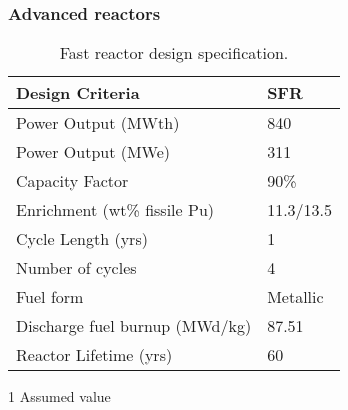 \begin{frame}
    \frametitle{Advanced reactors}
    \vspace{-0.7cm}
    \begingroup
        \renewcommand{\arraystretch}{1.5}
        \begin{table}
            \centering
            \begin{threeparttable}
        
            \caption{Fast reactor design specification.}
            \label{tab:fast_rx}
            \begin{tabular}{l l}
                \hline
                Design Criteria & SFR \cite{fichtlscherer_assessing_2019,triplett_prism:_2012}\\
                \hline
                Power Output (MWth) & 840 \\
                Power Output (MWe) & 311 \\
                Capacity Factor & 90\%\tnote{1} \\
                Enrichment (wt\% fissile Pu) &  11.3/13.5\\
                Cycle Length (yrs) & 1 \\
                Number of cycles &  4\\
                Fuel form &  Metallic \\
                Discharge fuel burnup (MWd/kg) & 87.51 \\
                Reactor Lifetime (yrs)&  60\\
                \hline
            \end{tabular}
            \begin{tablenotes}
                \item [1] Assumed value
            \end{tablenotes}
        \end{threeparttable}
        \end{table} 
    \endgroup
\end{frame}
